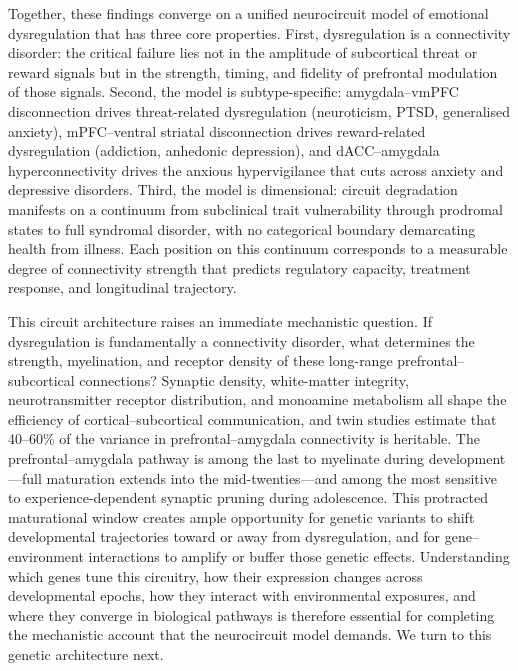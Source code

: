 Together, these findings converge on a unified neurocircuit model of
emotional dysregulation that has three core properties.  First,
dysregulation is a connectivity disorder: the critical failure lies not in
the amplitude of subcortical threat or reward signals but in the strength,
timing, and fidelity of prefrontal modulation of those signals.  Second,
the model is subtype-specific: amygdala--vmPFC disconnection drives
threat-related dysregulation (neuroticism, PTSD, generalised anxiety),
mPFC--ventral striatal disconnection drives reward-related dysregulation
(addiction, anhedonic depression), and dACC--amygdala hyperconnectivity
drives the anxious hypervigilance that cuts across anxiety and depressive
disorders.  Third, the model is dimensional: circuit degradation manifests
on a continuum from subclinical trait vulnerability through prodromal states
to full syndromal disorder, with no categorical boundary demarcating health
from illness.  Each position on this continuum corresponds to a measurable
degree of connectivity strength that predicts regulatory capacity,
treatment response, and longitudinal trajectory.

This circuit architecture raises an immediate mechanistic question.  If
dysregulation is fundamentally a connectivity disorder, what determines the
strength, myelination, and receptor density of these long-range
prefrontal--subcortical connections?  Synaptic density, white-matter
integrity, neurotransmitter receptor distribution, and monoamine
metabolism all shape the efficiency of cortical--subcortical
communication, and twin studies estimate that 40--60\% of the variance
in prefrontal--amygdala connectivity is heritable.  The
prefrontal--amygdala pathway is among the last to myelinate during
development---full maturation extends into the mid-twenties---and among
the most sensitive to experience-dependent synaptic pruning during
adolescence.  This protracted maturational window creates ample
opportunity for genetic variants to shift developmental trajectories
toward or away from dysregulation, and for gene--environment interactions
to amplify or buffer those genetic effects.  Understanding which genes
tune this circuitry, how their expression changes across developmental
epochs, how they interact with environmental exposures, and where they
converge in biological pathways is therefore essential for completing the
mechanistic account that the neurocircuit model demands.  We turn to
this genetic architecture next.
